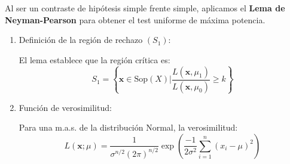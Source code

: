 \begin{enumerate}[label=\color{red}\textbf{\arabic*)}]
\begin{enumerate}[label=\color{red}\textbf{\alph*)}]
		            Al ser un contraste de hipótesis simple frente simple, aplicamos el \textbf{Lema de Neyman-Pearson} para obtener el test uniforme de máxima potencia.
		            \begin{enumerate}[label=\arabic*)]
			            \item Definición de la región de rechazo $(S_1)$:

			                  El lema establece que la región crítica es: \[
				                  S_1=\left\{ \mathbf{x}\in \mathrm{Sop}(X)\bigg| \dfrac{L(\mathbf{x},\mu_1)}{L(\mathbf{x},\mu_0)}\ge k\right\}
			                  \]
			            \item Función de verosimilitud:

			                  Para una m.a.s. de la distribución Normal, la verosimilitud: \[
				                  L(\mathbf{x};\mu)=\dfrac{1}{\sigma^{n / 2}(2\pi)^{n / 2}}\exp \left( \dfrac{-1}{2\sigma^2}\sum_{i=1}^{n} (x_{i}-\mu)^2 \right)
			                  \]


\end{enumerate}
\end{enumerate}
\end{enumerate}
